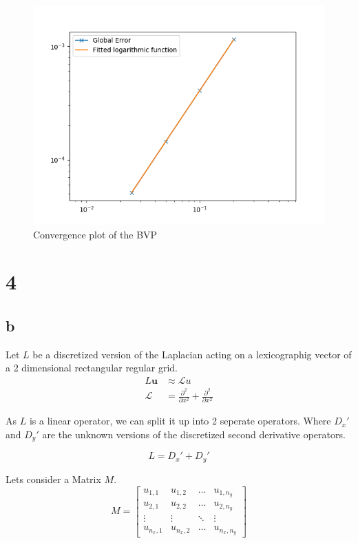 \documentclass{article}
\begin{document}
\begin{figure}[H]
    \centering
    \includegraphics[width=.9\linewidth]{convergence.png}
    \caption{Convergence plot of the BVP}
\end{figure}


\section{4}
\newpage
\subsection{b}

    
Let $L$ be a discretized version of the Laplacian acting on a lexicographig vector of a 2 dimensional rectangular regular grid.
\begin{align}
    L\mathbf{u} &\approx \mathcal{L} u\\
    \mathcal{L} &= \frac{\partial^2}{\partial x^2} + \frac{\partial^2}{\partial x^2}
\end{align}

As $L$ is a linear operator, we can split it up into 2 seperate operators. Where $D_x'$ and $D_y'$ are the unknown versions of the discretized second derivative operators.

\begin{equation}
    L = D_x' + D_y'
\end{equation}

Lets consider a Matrix $M$.
\begin{equation}
    M = \begin{bmatrix}
        u_{1,1} & u_{1,2} & \dots & u_{1,n_y} \\
        u_{2,1} & u_{2,2} & \dots & u_{2,n_y} \\
        \vdots & \vdots & \ddots & \vdots \\
        u_{n_x,1} & u_{n_x,2} & \dots & u_{n_x,n_y}
    \end{bmatrix}
\end{equation}
\end{document}

